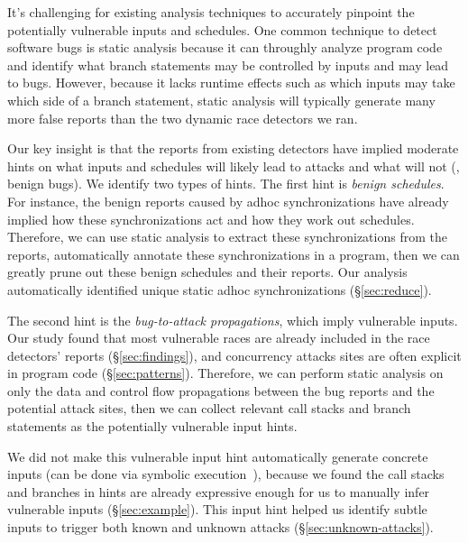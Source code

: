 It's challenging for existing analysis techniques to accurately 
pinpoint the potentially vulnerable inputs and schedules. One common 
technique to detect software bugs is static analysis because it can 
throughly analyze program code and identify what branch statements may be 
controlled by inputs and may lead to bugs. However, because it lacks runtime 
effects such as which inputs may take which side of a branch statement, static 
analysis will typically generate many more false reports than the two 
dynamic race detectors we ran.




Our key insight is that the reports from existing detectors have implied 
moderate hints on what inputs and schedules will likely lead to attacks and 
what will not (\eg, benign bugs). We identify two types of hints. The first 
hint is \emph{benign schedules}. For instance, the benign reports caused by 
adhoc synchronizations have already implied how these synchronizations act 
and how they work out schedules. Therefore, we can use static 
analysis to extract these synchronizations from the reports, automatically 
annotate these synchronizations in a program, then we can greatly prune out 
these benign schedules and their reports. Our analysis automatically identified
\nadhocsync unique static adhoc synchronizations (\S\ref{sec:reduce}).

The second hint is the \emph{bug-to-attack propagations}, which imply 
vulnerable inputs. Our study found that most vulnerable races are 
already included in the race detectors' reports (\S\ref{sec:findings}), and 
concurrency attacks sites are often explicit in program code 
(\S\ref{sec:patterns}). Therefore, we can perform static analysis on only the 
data and control flow propagations between the bug reports and the potential 
attack sites, then we can collect relevant call stacks and branch statements as 
the potentially vulnerable input hints.

We did not make this vulnerable input hint automatically generate concrete
inputs (can be done via symbolic execution~\cite{klee:osdi08,ucklee:usec15}), 
because we found the call stacks and branches in hints are already expressive 
enough for us to manually infer vulnerable inputs (\S\ref{sec:example}). This 
input hint helped us identify subtle inputs to trigger both known and 
unknown attacks (\S\ref{sec:unknown-attacks}).

